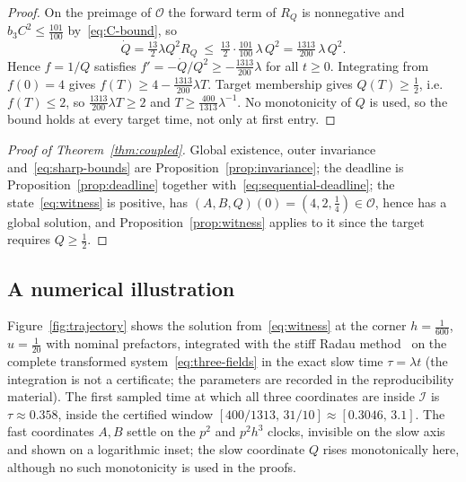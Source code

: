 \documentclass[11pt,a4paper]{article}
\theoremstyle{plain}
\theoremstyle{definition}
\theoremstyle{remark}
\newcommand{\calO}{\mathcal O}
\newcommand{\calI}{\mathcal I}
\begin{document}
\begin{proof}
On the preimage of $\calO$ the forward term of $R_Q$ is nonnegative and $b_3C^2\le\tfrac{101}{100}$ by~\eqref{eq:C-bound}, so
\[
 \dot Q=\tfrac{13}{2}\lambda Q^2R_Q\ \le\ \tfrac{13}{2}\cdot\tfrac{101}{100}\,\lambda\,Q^2=\tfrac{1313}{200}\,\lambda\,Q^2 .
\]
Hence $f=1/Q$ satisfies $f'=-\dot Q/Q^2\ge-\tfrac{1313}{200}\lambda$ for all $t\ge0$. Integrating from $f(0)=4$ gives $f(T)\ge4-\tfrac{1313}{200}\lambda T$. Target membership gives $Q(T)\ge\tfrac12$, i.e.\ $f(T)\le2$, so $\tfrac{1313}{200}\lambda T\ge2$ and $T\ge\tfrac{400}{1313}\lambda^{-1}$. No monotonicity of $Q$ is used, so the bound holds at every target time, not only at first entry.
\end{proof}

\begin{proof}[Proof of Theorem~\ref{thm:coupled}]
Global existence, outer invariance and~\eqref{eq:sharp-bounds} are Proposition~\ref{prop:invariance}; the deadline is Proposition~\ref{prop:deadline} together with~\eqref{eq:sequential-deadline}; the state~\eqref{eq:witness} is positive, has $(A,B,Q)(0)=(4,2,\tfrac14)\in\calO$, hence has a global solution, and Proposition~\ref{prop:witness} applies to it since the target requires $Q\ge\tfrac12$.
\end{proof}

\subsection{A numerical illustration}
Figure~\ref{fig:trajectory} shows the solution from~\eqref{eq:witness} at the corner $h=\tfrac1{600}$, $u=\tfrac1{20}$ with nominal prefactors, integrated with the stiff Radau method~\cite{HairerWanner1996} on the complete transformed system~\eqref{eq:three-fields} in the exact slow time $\tau=\lambda t$ (the integration is not a certificate; the parameters are recorded in the reproducibility material). The first sampled time at which all three coordinates are inside $\calI$ is $\tau\approx0.358$, inside the certified window $[400/1313,\,31/10]\approx[0.3046,\,3.1]$. The fast coordinates $A,B$ settle on the $p^2$ and $p^2h^3$ clocks, invisible on the slow axis and shown on a logarithmic inset; the slow coordinate $Q$ rises monotonically here, although no such monotonicity is used in the proofs.
\end{document}

